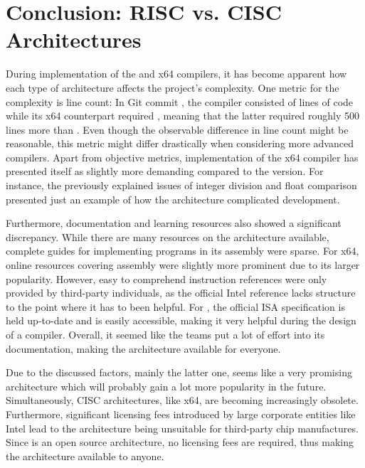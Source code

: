 \section{Conclusion: RISC vs. CISC Architectures}

During implementation of the \riscv{} and x64 compilers, it has become apparent how each type of architecture affects the project's  complexity.
One metric for the complexity is line count:
In Git commit \rushCommit{}, the \riscv{} compiler consisted of  lines of code while
its x64 counterpart required , meaning that the latter required roughly 500 lines more than \riscv{}.
Even though the observable difference in line count might be reasonable, this metric might differ drastically when considering more advanced compilers.
Apart from objective metrics, implementation of the x64 compiler has presented itself as slightly more demanding compared to the \riscv{} version.
For instance, the previously explained issues of integer division and float comparison presented just an example of how the architecture complicated development.

Furthermore, documentation and learning resources also showed a significant discrepancy.
While there are many resources on the \riscv{} architecture available,
complete guides for implementing programs in its assembly were sparse.
For x64, online resources covering assembly were slightly more prominent due to its larger popularity.
However, easy to comprehend instruction references were only provided by third-party individuals,
as the official Intel reference lacks structure to the point where it has to been helpful. 
For \riscv{}, the official ISA specification is held up-to-date and is easily accessible,
making it very helpful during the design of a compiler.
Overall, it seemed like the \riscv{} teams put a lot of effort into its documentation,
making the architecture available for everyone.

Due to the discussed factors, mainly the latter one,
\riscv{} seems like a very promising architecture which will probably gain a lot more popularity in the future.
Simultaneously, CISC architectures, like x64, are becoming increasingly obsolete.
Furthermore, significant licensing fees introduced by large corporate entities like Intel
lead to the architecture being unsuitable for third-party chip manufactures.
Since \riscv{} is an open source architecture, no licensing fees are required,
thus making the architecture available to anyone.

